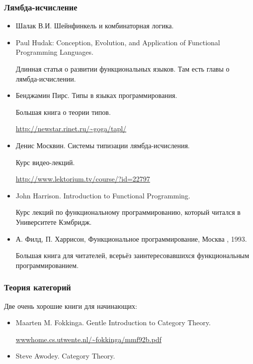 \subsubsection{Лямбда-исчисление}

\begin{itemize}
\item Шалак В.И. Шейнфинкель и комбинаторная логика.
    
\item Paul Hudak: Conception, Evolution, and Application 
        of Functional Programming Languages.

      Длинная статья о развитии функциональных языков.
      Там есть главы о лямбда-исчислении. 

\item Бенджамин Пирс. Типы в языках программирования.

     Большая книга о теории типов. 

     \url{http://newstar.rinet.ru/~goga/tapl/}

\item Денис Москвин. Системы типизации лямбда-исчисления. 

    Курс видео-лекций.

    \url{http://www.lektorium.tv/course/?id=22797}

\item John Harrison. Introduction to Functional Programming.

    Курс лекций по функциональному программированию, который
    читался в Университете Кэмбридж.

\item А. Филд, П. Харрисон, Функциональное программирование,
    Москва , 1993. 

    Большая книга для читателей, всерьёз заинтересовавшихся
    функциональным программированием.  

\end{itemize}

\subsubsection{Теория категорий}

Две очень хорошие книги для начинающих:

\begin{itemize}
\item Maarten M. Fokkinga. Gentle Introduction to Category Theory.

\url{wwwhome.cs.utwente.nl/~fokkinga/mmf92b.pdf}

\item Steve Awodey. Category Theory.
    
\end{itemize}

